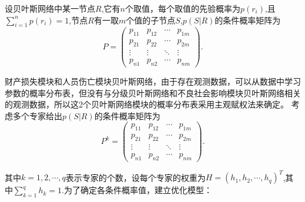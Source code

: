 \documentclass[bwprint]{gmcmthesis}
\begin{document}
设贝叶斯网络中某一节点$R$,它有$n$个取值，每个取值的先验概率为$p(r_i)$,且$\sum_{i=1}^np(r_i)=1$,节点$R$有一取$m$个值的子节点$S$,$p(S|R)$的条件概率矩阵为
\begin{equation}
	P=\left( \begin{matrix}
	p_{11} & p_{12} & \cdots & p_{1m} \\ 
	p_{21} & p_{22} & \cdots & p_{2m} \\ 
	\vdots & \vdots & \ddots & \vdots \\ 
	p_{n1} & p_{n2} & \cdots & p_{nm}
	\end{matrix} \right).
\end{equation}

财产损失模块和人员伤亡模块贝叶斯网络，由于存在观测数据，可以从数据中学习参数的概率分布表，但没有与分级贝叶斯网络和不良社会影响模块贝叶斯网络相关的观测数据，所以这2个贝叶斯网络模块的概率分布表采用主观赋权法来确定。
考虑多个专家给出$p(S|R)$的条件概率矩阵为
\begin{equation}
P^k=\left( \begin{matrix}
p_{11} & p_{12} & \cdots & p_{1m} \\ 
p_{21} & p_{22} & \cdots & p_{2m} \\ 
\vdots & \vdots & \ddots & \vdots \\ 
p_{n1} & p_{n2} & \cdots & p_{nm}
\end{matrix} \right).
\end{equation}

其中$k=1,2,\cdots,q$表示专家的个数，设每个专家的权重为$H=(h_1,h_2,\cdots,h_q)^T$,其中$\sum_{k=1}^qh_k=1$.为了确定各条件概率值，建立优化模型：

\end{document}
